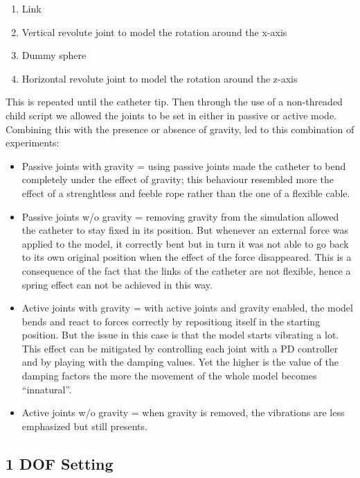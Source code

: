 \documentclass[conference,12pt]{IEEEtran}
\begin{document}
\begin{enumerate}
	\item Link
	\item Vertical revolute joint to model the rotation around the x-axis
    \item Dummy sphere
    \item Horizontal revolute joint to model the rotation around the z-axis
\end{enumerate}

This is repeated until the catheter tip. Then through the use of a non-threaded child script we allowed the joints to be set in either in passive or active mode. Combining this with the presence or absence of gravity, led to this combination of experiments:

\begin{itemize}

	\item Passive joints with gravity = using passive joints made the catheter to bend completely under the effect of gravity; this behaviour resembled more the effect of a strenghtless and feeble rope rather than the one 			  of a flexible cable.
	\item Passive joints w/o gravity = removing gravity from the simulation allowed the catheter to stay fixed in its position.  But 			  whenever an external force was applied to the model, it correctly bent but in turn it was not able to go back to its own
		  original position when the effect of the force disappeared. This is a consequence of the fact that the links of the catheter 			  are not flexible, hence a spring effect can not be achieved in this way.
	\item Active joints with gravity = with active joints and gravity enabled, the model bends and react to forces correctly by 					  repositiong itself in the starting position. But the issue in this case is that the model starts vibrating a lot. This effect 		  can be mitigated by controlling each joint with a PD controller and by playing with the damping values. Yet the higher is the 		  value of the damping factors the more the movement of the whole model becomes “innatural”.
	\item Active joints w/o gravity = when gravity is removed, the vibrations are less emphasized but still presents.
\end{itemize}

\subsection{1 DOF Setting}
\end{document}
